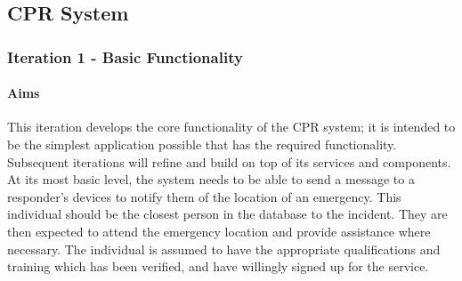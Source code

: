 \documentclass{article}
\begin{document}
	\subsection{CPR System}
		\subsubsection{Iteration 1 - Basic Functionality}
			\paragraph{Aims}
			This iteration develops the core functionality of the CPR system; it is intended to be the simplest application possible that has the required functionality. Subsequent iterations will refine and build on top of its services and components.\\

At its most basic level, the system needs to be able to send a message to a responder’s devices to notify them of the location of an emergency. This individual should be the closest person in the database to the incident. They are then expected to attend the emergency location and provide assistance where necessary. The individual is assumed to have the appropriate qualifications and training which has been verified, and have willingly signed up for the service.\\
\end{document}
